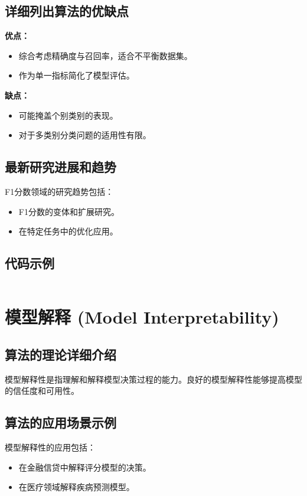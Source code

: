 \subsection*{详细列出算法的优缺点}
\textbf{优点：}
\begin{itemize}
    \item 综合考虑精确度与召回率，适合不平衡数据集。
    \item 作为单一指标简化了模型评估。
\end{itemize}

\textbf{缺点：}
\begin{itemize}
    \item 可能掩盖个别类别的表现。
    \item 对于多类别分类问题的适用性有限。
\end{itemize}

\subsection*{最新研究进展和趋势}
F1分数领域的研究趋势包括：
\begin{itemize}
    \item F1分数的变体和扩展研究。
    \item 在特定任务中的优化应用。
\end{itemize}
\subsection*{代码示例}
\begin{lstlisting}

\end{lstlisting}


\section{模型解释 (Model Interpretability)}
\subsection*{算法的理论详细介绍}
模型解释性是指理解和解释模型决策过程的能力。良好的模型解释性能够提高模型的信任度和可用性。

\subsection*{算法的应用场景示例}
模型解释性的应用包括：
\begin{itemize}
    \item 在金融信贷中解释评分模型的决策。
    \item 在医疗领域解释疾病预测模型。
\end{itemize}

